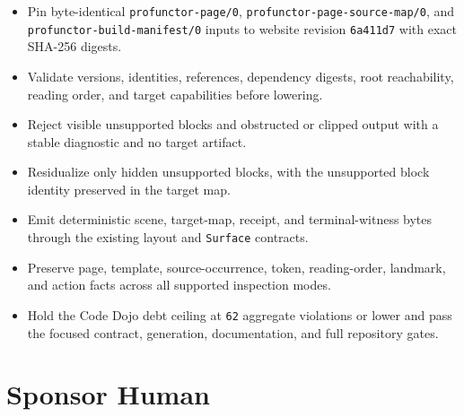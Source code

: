 \begin{itemize}
\tightlist
\item
  Pin byte-identical \texttt{p\allowbreak{}r\allowbreak{}o\allowbreak{}f\allowbreak{}u\allowbreak{}n\allowbreak{}c\allowbreak{}t\allowbreak{}o\allowbreak{}r\allowbreak{}-\allowbreak{}p\allowbreak{}a\allowbreak{}g\allowbreak{}e\allowbreak{}/\allowbreak{}0}, \texttt{p\allowbreak{}r\allowbreak{}o\allowbreak{}f\allowbreak{}u\allowbreak{}n\allowbreak{}c\allowbreak{}t\allowbreak{}o\allowbreak{}r\allowbreak{}-\allowbreak{}p\allowbreak{}a\allowbreak{}g\allowbreak{}e\allowbreak{}-\allowbreak{}s\allowbreak{}o\allowbreak{}u\allowbreak{}r\allowbreak{}c\allowbreak{}e\allowbreak{}-\allowbreak{}m\allowbreak{}a\allowbreak{}p\allowbreak{}/\allowbreak{}0}, and \texttt{p\allowbreak{}r\allowbreak{}o\allowbreak{}f\allowbreak{}u\allowbreak{}n\allowbreak{}c\allowbreak{}t\allowbreak{}o\allowbreak{}r\allowbreak{}-\allowbreak{}b\allowbreak{}u\allowbreak{}i\allowbreak{}l\allowbreak{}d\allowbreak{}-\allowbreak{}m\allowbreak{}a\allowbreak{}n\allowbreak{}i\allowbreak{}f\allowbreak{}e\allowbreak{}s\allowbreak{}t\allowbreak{}/\allowbreak{}0} inputs to website revision \texttt{6\allowbreak{}a\allowbreak{}4\allowbreak{}1\allowbreak{}1\allowbreak{}d\allowbreak{}7} with exact SHA-256 digests.
\item
  Validate versions, identities, references, dependency digests, root reachability, reading order, and target capabilities before lowering.
\item
  Reject visible unsupported blocks and obstructed or clipped output with a stable diagnostic and no target artifact.
\item
  Residualize only hidden unsupported blocks, with the unsupported block identity preserved in the target map.
\item
  Emit deterministic scene, target-map, receipt, and terminal-witness bytes through the existing layout and \texttt{S\allowbreak{}u\allowbreak{}r\allowbreak{}f\allowbreak{}a\allowbreak{}c\allowbreak{}e} contracts.
\item
  Preserve page, template, source-occurrence, token, reading-order, landmark, and action facts across all supported inspection modes.
\item
  Hold the Code Dojo debt ceiling at \texttt{6\allowbreak{}2} aggregate violations or lower and pass the focused contract, generation, documentation, and full repository gates.
\end{itemize}

\section{Sponsor Human}\label{record-146-sponsor-human}

